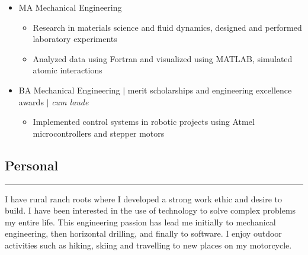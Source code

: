 \documentclass[10pt]{article}
\newenvironment{roles}
{ \vspace{0.25em}
  \begin{itemize}
    \setlength{\itemsep}{-0.75em}
    \setlength{\parskip}{0em}
    \setlength{\parsep}{-0.5em}
    \setlength{\partopsep}{0pt}
    \setlength{\topsep}{0pt}
}
{ \end{itemize}
  \vspace{0.5em}
}
\newcommand*\minitem{
  \vspace{-0.25em}
  \item[$\cdot$]
  \vspace{-0.25em}
}
\newcommand*\nvssec{
  \vspace{-1.5em}
  \subsection*
}
\newenvironment{majitem}
{
  \vspace{-0.5em}
  \item[]
}
{
  \vspace{0.5em}
}
\begin{document}
\begin{roles}
  \begin{majitem}
    MA Mechanical Engineering
  \end{majitem}
  \begin{roles}
    \minitem Research in materials science and fluid dynamics, designed and performed laboratory experiments \\
    \minitem Analyzed data using Fortran and visualized using MATLAB, simulated atomic interactions\\
  \end{roles}

  \begin{majitem}
    BA Mechanical Engineering $\vert$ merit scholarships and engineering excellence awards $\vert$ \emph{cum laude}
  \end{majitem}
  \begin{roles}
    \minitem Implemented control systems in robotic projects using Atmel microcontrollers and stepper motors  \
  \end{roles}
\end{roles}
\nvssec{Personal}
\vspace{-1.5em}
\noindent\rule{\textwidth}{0.5pt}
\indent I have rural ranch roots where I developed a strong work ethic and desire to build.  I have been interested in the use of technology to solve complex problems my entire life.  This engineering passion has lead me initially to mechanical engineering, then horizontal drilling, and finally to software.  I enjoy outdoor activities such as hiking, skiing and travelling to new places on my motorcycle.
\end{document}
